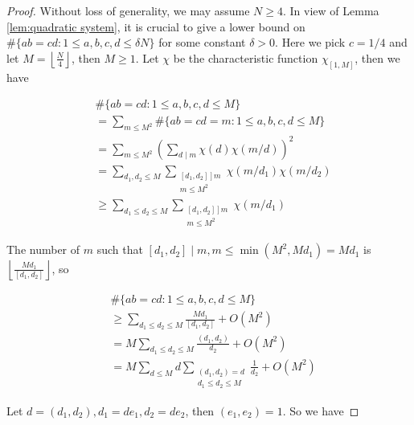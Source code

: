 \begin{proof}
Without loss of generality, we may assume $N \geq 4$. In view of Lemma \ref{lem:quadratic system}, it is crucial to give a lower bound on $\#\{a b=c d: 1 \leq a, b, c, d \leq \delta N\}$ for some constant $\delta>0$. Here we pick $c=1 / 4$ and let $M=\left\lfloor\frac{N}{4}\right\rfloor$, then $M \geq 1$. Let $\chi$ be the characteristic function $\chi_{[1, M]}$, then we have

$$
\begin{aligned}
& \#\{a b=c d: 1 \leq a, b, c, d \leq M\} \\
& =\sum_{m \leq M^{2}} \#\{a b=c d=m: 1 \leq a, b, c, d \leq M\} \\
& =\sum_{m \leq M^{2}}\left(\sum_{d \mid m} \chi(d) \chi(m / d)\right)^{2} \\
& =\sum_{d_{1}, d_{2} \leq M} \sum_{\substack{\left.\left[d_{1}, d_{2}\right]\right] m \\
m \leq M^{2}}} \chi\left(m / d_{1}\right) \chi\left(m / d_{2}\right) \\
& \geq \sum_{d_{1} \leq d_{2} \leq M} \sum_{\substack{\left.\left[d_{1}, d_{2}\right]\right] m \\
m \leq M^{2}}} \chi\left(m / d_{1}\right)
\end{aligned}
$$

The number of $m$ such that $\left[d_{1}, d_{2}\right] \mid m, m \leq \min \left(M^{2}, M d_{1}\right)=M d_{1}$ is $\left\lfloor\frac{M d_{1}}{\left[d_{1}, d_{2}\right]}\right\rfloor$, so

$$
\begin{aligned}
& \#\{a b=c d: 1 \leq a, b, c, d \leq M\} \\
& \geq \sum_{d_{1} \leq d_{2} \leq M} \frac{M d_{1}}{\left[d_{1}, d_{2}\right]}+O\left(M^{2}\right) \\
& =M \sum_{d_{1} \leq d_{2} \leq M} \frac{\left(d_{1}, d_{2}\right)}{d_{2}}+O\left(M^{2}\right) \\
& =M \sum_{d \leq M} d \sum_{\substack{\left(d_{1}, d_{2}\right)=d \\
d_{1} \leq d_{2} \leq M}} \frac{1}{d_{2}}+O\left(M^{2}\right)
\end{aligned}
$$

Let $d=\left(d_{1}, d_{2}\right), d_{1}=d e_{1}, d_{2}=d e_{2}$, then $\left(e_{1}, e_{2}\right)=1$. So we have


\end{proof}
